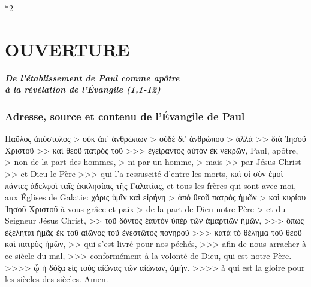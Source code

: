 \documentclass[14pt,a4paper,twoside]{extarticle}
\newcommand{\commentaire}[1]{\par\vspace{-0.8em}%
  {\centering\large\bfseries\itshape #1\par}\vspace{0.6em}}
\begin{document}
\pagestyle{fancy}
\fancyhf{} %
\renewcommand{\headrulewidth}{0pt} %

\pagegauche

\begin{paracol}[1]*{2}
  \switchcolumn[1] %


  \section*{OUVERTURE}
  \commentaire{De l'établissement de Paul comme apôtre\\ à la révélation de l'Évangile (1,1-12)}
  \subsubsection*{Adresse, source et contenu de l'Évangile de Paul}
  \verset
  {Παῦλος ἀπόστολος
    > οὐκ ἀπ’ ἀνθρώπων
    > οὐδὲ δι’ ἀνθρώπου
    > ἀλλὰ
    >> διὰ Ἰησοῦ Χριστοῦ
    >> καὶ θεοῦ πατρὸς τοῦ
    >>> ἐγείραντος αὐτὸν ἐκ νεκρῶν,}
  {Paul, apôtre,
    > non de la part des hommes,
    > ni par un homme,
    > mais
    >> par Jésus Christ
    >> et Dieu le Père
    >>> qui l’a ressuscité d’entre les morts,}
  \verset
  {καὶ οἱ σὺν ἐμοὶ πάντες ἀδελφοὶ
    ταῖς ἐκκλησίαις τῆς Γαλατίας,}
  {et tous les frères qui sont avec moi,
    aux Églises de Galatie:}
  \verset
  {χάρις ὑμῖν καὶ εἰρήνη
    > ἀπὸ θεοῦ πατρὸς ἡμῶν
    > καὶ κυρίου Ἰησοῦ Χριστοῦ}
  {à vous grâce et paix
    > de la part de Dieu notre Père
    > et du Seigneur Jésus Christ,}
  \verset
  {>> τοῦ δόντος ἑαυτὸν ὑπὲρ τῶν ἁμαρτιῶν ἡμῶν,
    >>> ὅπως ἐξέληται ἡμᾶς ἐκ τοῦ αἰῶνος τοῦ ἐνεστῶτος πονηροῦ
    >>> κατὰ τὸ θέλημα τοῦ θεοῦ καὶ πατρὸς ἡμῶν,}
  {>> qui s’est livré pour nos péchés,
    >>> afin de nous arracher à ce siècle du mal,
    >>> conformément à la volonté de Dieu, qui est notre Père.}
  \verset
  {>>>> ᾧ ἡ δόξα εἰς τοὺς αἰῶνας τῶν αἰώνων, ἀμήν.}
  {>>>> à qui est la gloire pour les siècles des siècles. Amen.}


\end{paracol}
\end{document}
